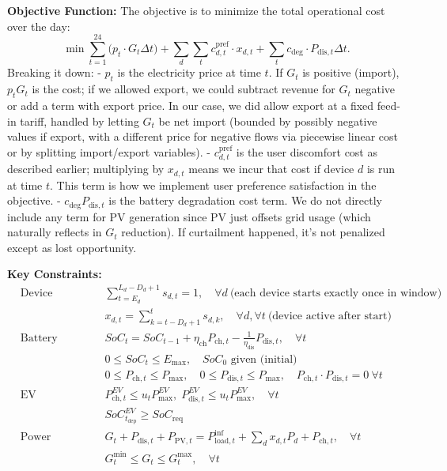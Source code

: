 \documentclass[12pt,a4paper]{article}
\begin{document}
\textbf{Objective Function:} The objective is to minimize the total operational cost over the day:
\[
\min \sum_{t=1}^{24} \Big( p_t \cdot G_t \Delta t \Big) + \sum_{d}\sum_{t} c^{\text{pref}}_{d,t} \cdot x_{d,t} + \sum_{t} c_{\text{deg}} \cdot P_{\text{dis},t} \Delta t.
\]
Breaking it down:
- $p_t$ is the electricity price at time $t$. If $G_t$ is positive (import), $p_t G_t$ is the cost; if we allowed export, we could subtract revenue for $G_t$ negative or add a term with export price. In our case, we did allow export at a fixed feed-in tariff, handled by letting $G_t$ be net import (bounded by possibly negative values if export, with a different price for negative flows via piecewise linear cost or by splitting import/export variables).
- $c^{\text{pref}}_{d,t}$ is the user discomfort cost as described earlier; multiplying by $x_{d,t}$ means we incur that cost if device $d$ is run at time $t$. This term is how we implement user preference satisfaction in the objective.
- $c_{\text{deg}} P_{\text{dis},t}$ is the battery degradation cost term.
We do not directly include any term for PV generation since PV just offsets grid usage (which naturally reflects in $G_t$ reduction). If curtailment happened, it’s not penalized except as lost opportunity.

\textbf{Key Constraints:}
\begin{align}
& \text{Device scheduling:} && \sum_{t=E_d}^{L_d-D_d+1} s_{d,t} = 1, \quad \forall d \ \text{(each device starts exactly once in window)} \tag{1}\\
& && x_{d,t} = \sum_{k=t-D_d+1}^{t} s_{d,k}, \quad \forall d, \forall t \ \text{(device active after start)} \tag{2}\\[1ex]
& \text{Battery dynamics:} && SoC_{t} = SoC_{t-1} + \eta_{\text{ch}} P_{\text{ch},t} - \frac{1}{\eta_{\text{dis}}} P_{\text{dis},t}, \quad \forall t \tag{3}\\
& && 0 \le SoC_t \le E_{\max}, \quad SoC_0 \text{ given (initial)} \tag{4}\\
& && 0 \le P_{\text{ch},t} \le P_{\max}, \quad 0 \le P_{\text{dis},t} \le P_{\max}, \quad P_{\text{ch},t} \cdot P_{\text{dis},t} = 0 \ \forall t \tag{5}\\[1ex]
& \text{EV constraints:} && P_{\text{ch},t}^{EV} \le u_t P_{\max}^{EV}, \; P_{\text{dis},t}^{EV} \le u_t P_{\max}^{EV}, \quad \forall t \tag{6}\\
& && SoC_{t_{\text{dep}}}^{EV} \ge SoC_{\text{req}} \tag{7}\\[1ex]
& \text{Power balance:} && G_t + P_{\text{dis},t} + P_{\text{PV},t} = P_{\text{load},t}^{\text{inf}} + \sum_d x_{d,t} P_d + P_{\text{ch},t}, \quad \forall t \tag{8}\\
& && G_t^{\min} \le G_t \le G_t^{\max}, \quad \forall t \tag{9}
\end{align}
\end{document}
